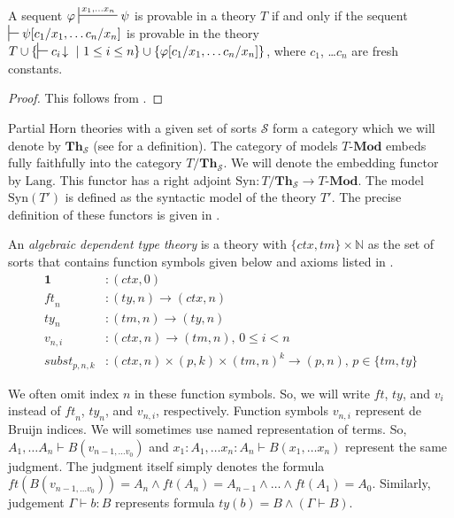 \documentclass[reqno]{amsart}
\theoremstyle{definition}
\theoremstyle{remark}
\newcommand{\cat}[1]{\mathbf{#1}}
\newcommand{\Mod}[1]{#1\text{-}\cat{Mod}}
\newcommand{\Th}{\cat{Th}}
\newcommand{\emptyCtx}{\mathbf{1}}
\newcommand{\Syn}{\mathrm{Syn}}
\newcommand{\Lang}{\mathrm{Lang}}
\newcommand{\subst}{\mathit{subst}}
\newcommand{\ft}{\mathit{ft}}
\newcommand{\ty}{\mathit{ty}}
\newcommand{\ctx}{\mathit{ctx}}
\newcommand{\tm}{\mathit{tm}}
\numberwithin{figure}{section}
\begin{document}
\begin{lem}[mcf]
A sequent $\varphi \sststile{}{x_1, \ldots x_n} \psi$ is provable in a theory $T$ if and only if
the sequent $\sststile{}{} \psi[c_1/x_1, \ldots c_n/x_n]$ is provable in the theory $T \cup \{ \sststile{}{} c_i\!\downarrow\ |\ 1 \leq i \leq n \} \cup \{ \varphi[c_1/x_1, \ldots c_n/x_n] \}$,
where $c_1$, \ldots $c_n$ are fresh constants.
\end{lem}
\begin{proof}
This follows from \cite[Theorem~10, Theorem~11]{PHL}.
\end{proof}

Partial Horn theories with a given set of sorts $\mathcal{S}$ form a category which we will denote by $\Th_\mathcal{S}$ (see \cite[Section~2]{alg-tt} for a definition).
The category of models $\Mod{T}$ embeds fully faithfully into the category $T/\Th_\mathcal{S}$.
We will denote the embedding functor by $\Lang$.
This functor has a right adjoint $\Syn : T/\Th_\mathcal{S} \to \Mod{T}$.
The model $\Syn(T')$ is defined as the syntactic model of the theory $T'$.
The precise definition of these functors is given in \cite[Section~4.1]{alg-models}.

An \emph{algebraic dependent type theory} is a theory with $\{ \ctx, \tm \} \times \mathbb{N}$ as the set of sorts that contains function symbols given below and axioms listed in \cite[Section~3.1]{alg-tt}.
\begin{align*}
\emptyCtx      & : (\ctx,0) \\
\ft_n          & : (\ty,n) \to (\ctx,n) \\
\ty_n          & : (\tm,n) \to (\ty,n) \\
v_{n,i}        & : (\ctx,n) \to (\tm,n) \text{, } 0 \leq i < n \\
\subst_{p,n,k} & : (\ctx,n) \times (p,k) \times (\tm,n)^k \to (p,n) \text{, } p \in \{ \tm, \ty \}
\end{align*}

We often omit index $n$ in these function symbols.
So, we will write $\ft$, $\ty$, and $v_i$ instead of $\ft_n$, $\ty_n$, and $v_{n,i}$, respectively.
Function symbols $v_{n,i}$ represent de Bruijn indices.
We will sometimes use named representation of terms.
So, $A_1, \ldots A_n \vdash B(v_{n-1, \ldots v_0})$ and $x_1 : A_1, \ldots x_n : A_n \vdash B(x_1, \ldots x_n)$ represent the same judgment.
The judgment itself simply denotes the formula $\ft(B(v_{n-1, \ldots v_0})) = A_n \land \ft(A_n) = A_{n-1} \land \ldots \land \ft(A_1) = A_0$.
Similarly, judgement $\Gamma \vdash b : B$ represents formula $\ty(b) = B \land (\Gamma \vdash B)$.
\end{document}
